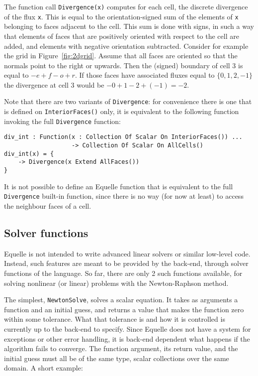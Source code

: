 \documentclass[11pt]{article}
\newcommand{\code}[1]{\texttt{#1}}
\begin{document}
The function call \code{Divergence(x)} computes for each cell, the discrete divergence of
the flux \code{x}. This is equal to the orientation-signed sum of the elements of \code{x}
belonging to faces adjacent to the cell. This sum is done with signs, in such a way that
elements of faces that are positively oriented with respect to the cell are added, and
elements with negative orientation subtracted. Consider for example the grid in
Figure~\ref{fig:2dgrid}. Assume that all faces are oriented so that the normals point to
the right or upwards. Then the (signed) boundary of cell 3 is equal to $-e + f - o +
r$. If those faces have associated fluxes equal to $\{0, 1, 2, -1\}$ the divergence at
cell 3 would be $-0 + 1 - 2 + (-1) = -2$.

Note that there are two variants of \code{Divergence}: for convenience there is one that
is defined on \code{InteriorFaces()} only, it is equivalent to the following function
invoking the full \code{Divergence} function:

\begin{verbatim}
div_int : Function(x : Collection Of Scalar On InteriorFaces()) ...
                   -> Collection Of Scalar On AllCells()
div_int(x) = {
    -> Divergence(x Extend AllFaces())
}
\end{verbatim}

It is not possible to define an Equelle function that is equivalent to the full
\code{Divergence} built-in function, since there is no way (for now at least) to access
the neighbour faces of a cell.

\subsection{Solver functions}

Equelle is not intended to write advanced linear solvers or similar low-level
code. Instead, such features are meant to be provided by the back-end, through solver
functions of the language. So far, there are only 2 such functions available, for solving
nonlinear (or linear) problems with the Newton-Raphson method.

The simplest, \code{NewtonSolve}, solves a scalar equation. It takes as arguments a
function and an initial guess, and returns a value that makes the function zero within
some tolerance. What that tolerance is and how it is controlled is currently up to the
back-end to specify. Since Equelle does not have a system for exceptions or other error
handling, it is back-end dependent what happens if the algorithm fails to converge. The
function argument, its return value, and the initial guess must all be of the same type,
scalar collections over the same domain. A short example:
\end{document}
